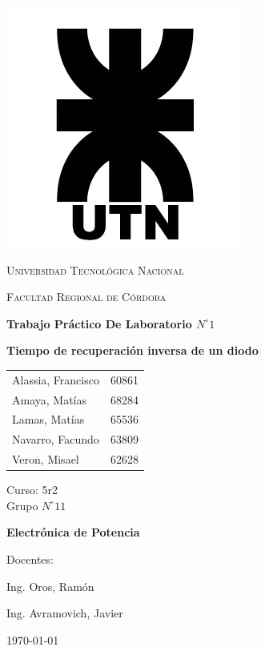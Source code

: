 \documentclass{article}
\begin{document}
\begin{titlepage}
 \centering
	\includegraphics[scale=0.80]{imagenes/LOGO.jpg} \par
 	\vspace{1cm}
 	{\scshape\LARGE Universidad Tecnológica Nacional \par}
 	{\scshape\large Facultad Regional de Córdoba \par}
 	\vspace{1cm}
	{\bfseries \Large Trabajo Práctico De Laboratorio $N^{\circ} 1$\par}
	{\bfseries \Large Tiempo de recuperación inversa de un diodo \par}
 	\vspace{1.5cm}

	\begin{tabular}{ll}
		Alassia, Francisco	&	60861	\\
		Amaya, Matías		&	68284	\\
		Lamas, Matías 		&	65536 	\\
		Navarro, Facundo 	&	63809 	\\
		Veron, Misael	 	&	62628
	\end{tabular}
	
	\vspace{1cm}
	Curso: 5r2 \\
	Grupo $N^{\circ} 11$
 	\vfill
	{\bfseries \Large Electrónica de Potencia \par}

	\vspace{1.5cm}
	Docentes: \par
	Ing. Oros, Ramón \par
	Ing. Avramovich, Javier \par

 	\vfill
	{\large \today\par}
\end{titlepage}
\end{document}
